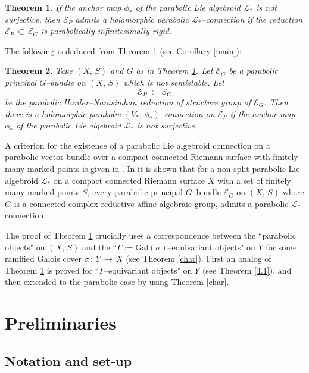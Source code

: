 \documentclass[12pt, reqno]{amsart}
\numberwithin{equation}{section}
\newtheorem{theorem}{Theorem}[section]
\newcommand{\Gal}{\textrm{Gal}}
\begin{document}
\begin{theorem}\label{int1}
If the anchor map $\phi_{*}$ of the parabolic Lie algebroid $\mathcal{L}_{*}$ is not surjective, then
$\mathcal{E}_{P}$ admits a holomorphic parabolic $\mathcal{L}_{*}$--connection if the reduction
$\mathcal{E}_{P}\, \subset\, \mathcal{E}_{G}$ is parabolically infinitesimally rigid.
\end{theorem}

The following is deduced from Theorem \ref{int1} (see Corollary \ref{main}):

\begin{theorem}\label{int2}
Take $(X,\, S)$ and $G$ as in Theorem \ref{int1}.
Let $\mathcal{E}_{G}$ be a parabolic principal $G$--bundle on $(X,\,S)$ which is not semistable.
Let $$\mathcal{E}_{P}\ \subset\ \mathcal{E}_{G}$$ be the parabolic 
Harder--Narasimhan reduction of structure group of $\mathcal{E}_{G}$.
Then there is a holomorphic parabolic $(V_{*},\, \phi_{*})$--connection on $\mathcal{E}_{P}$
if the anchor map $\phi_{*}$ of the parabolic Lie algebroid $\mathcal{L}_{*}$ is not surjective.
\end{theorem}

A criterion for the existence of a parabolic Lie algebroid connection on a parabolic vector bundle over a 
compact connected Riemann surface with finitely many marked points is given in \cite{ABKS}. In \cite{Bi1} it 
is shown that for a non-split parabolic Lie algebroid $\mathcal{L}_{*}$ on a compact connected Riemann 
surface $X$ with a set of finitely many marked points $S$, every parabolic principal $G$--bundle 
$\mathcal{E}_{G}$ on $(X,\,S)$ where $G$ is a connected complex reductive affine algebraic group, admits a 
parabolic $\mathcal{L}_{*}$ connection.

The proof of Theorem \ref{int1} crucially uses a correspondence between the ``parabolic objects" on $(X,\,S)$ 
and the ``$\Gamma:=\Gal(\sigma)$--equivariant objects" on $Y$ for some ramified Galois cover 
$\sigma\,:\,Y\,\longrightarrow\, X$ (see Theorem \ref{char}). First an analog of Theorem \ref{int1} is
proved for ``$\Gamma$--equivariant objects" on $Y$
(see Theorem \ref{4.1}), and then extended to the parabolic case by
using Theorem \ref{char}.

\section{Preliminaries}\label{prelim}

\subsection{Notation and set-up}\label{2.1}
\end{document}
